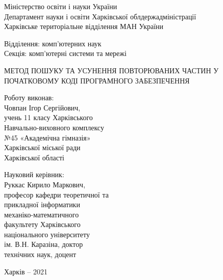 \documentclass[a4paper, 14pt]{article}
\begin{document}
\thispagestyle{empty}
\begin{spacing}{1}
\begin{center}
Міністерство освіти і науки України\\
Департамент науки і освіти Харківської облдержадміністрації\\
Харківське територіальне відділення МАН України\\
\end{center}\par\null\par
\begin{changemargin}{10cm}{0cm}
Відділення: комп'ютерних наук\\
Секція: комп'ютерні системи та мережі
\end{changemargin}\par\null\par
\begin{center}
МЕТОД ПОШУКУ ТА УСУНЕННЯ ПОВТОРЮВАНИХ
ЧАСТИН У ПОЧАТКОВОМУ КОДІ ПРОГРАМНОГО ЗАБЕЗПЕЧЕННЯ
\end{center}\par\null\par\null
\begin{changemargin}{10cm}{0cm}
Роботу виконав:\\ 
Човпан Ігор Сергійович,\\
учень 11 класу Харківського\\
Навчально-виховного комплексу\\
№45 «Академічна гімназія»\\
Харківської міської ради\\
Харківської області
\end{changemargin}\par
\begin{changemargin}{10cm}{0cm}
Науковий керівник:\\
Руккас Кирило Маркович,\\
професор кафедри теоретичної та\\
прикладної інформатики\\
механіко-математичного\\
факультету Харківського\\
національного університету\\
ім. В.Н. Каразіна, доктор\\
технічних наук, доцент\\
\vspace*{\fill}\end{changemargin}
\begin{center}
Харків -- 2021
\end{center}\end{spacing}
\end{document}
